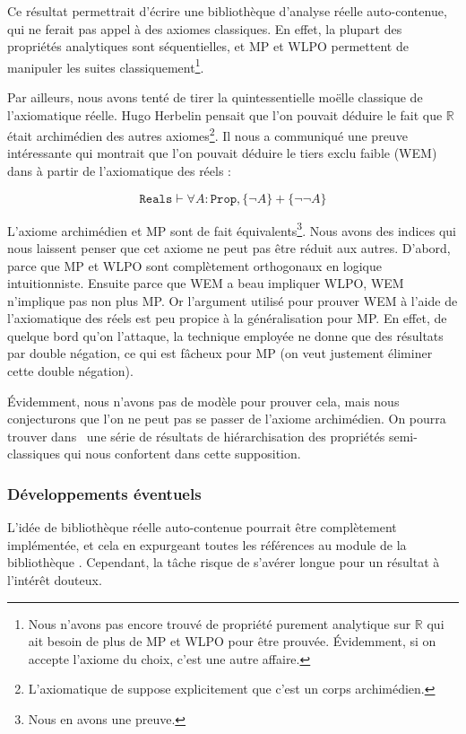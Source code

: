 Ce résultat permettrait d'écrire une bibliothèque d'analyse réelle auto-contenue, qui ne ferait pas appel à des axiomes classiques. En effet, la plupart des propriétés analytiques sont séquentielles, et MP et WLPO permettent de manipuler les suites classiquement\footnote{Nous n'avons pas encore trouvé de propriété purement analytique sur $\mathbb{R}$ qui ait besoin de plus de MP et WLPO pour être prouvée. Évidemment, si on accepte l'axiome du choix, c'est une autre affaire.}.

Par ailleurs, nous avons tenté de tirer la quintessentielle moëlle classique de l'axiomatique réelle. Hugo Herbelin pensait que l'on pouvait déduire le fait que $\mathbb{R}$ était archimédien des autres axiomes\footnote{L'axiomatique de \Coq{} suppose explicitement que c'est un corps archimédien.}. Il nous a communiqué une preuve intéressante qui montrait que l'on pouvait déduire le tiers exclu faible (WEM) dans  à partir de l'axiomatique des réels :

$$\mathtt{Reals}\vdash\forall A : \mathtt{Prop}, \{\neg A\} + \{\neg\neg A\}$$

L'axiome archimédien et MP sont de fait équivalents\footnote{Nous en avons une preuve.}. Nous avons des indices qui nous laissent penser que cet axiome ne peut pas être réduit aux autres. D'abord, parce que MP et WLPO sont complètement orthogonaux en logique intuitionniste. Ensuite parce que WEM a beau impliquer WLPO, WEM n'implique pas non plus MP. Or l'argument utilisé pour prouver WEM à l'aide de l'axiomatique des réels est peu propice à la généralisation pour MP. En effet, de quelque bord qu'on l'attaque, la technique employée ne donne que des résultats par double négation, ce qui est fâcheux pour MP (on veut justement éliminer cette double négation).

Évidemment, nous n'avons pas de modèle pour prouver cela, mais nous conjecturons que l'on ne peut pas se passer de l'axiome archimédien. On pourra trouver dans~\cite{LICS04} une série de résultats de hiérarchisation des propriétés semi-classiques qui nous confortent dans cette supposition.

\subsubsection{Développements éventuels}

L'idée de bibliothèque réelle auto-contenue pourrait être complètement implémentée, et cela en expurgeant toutes les références au module  de la bibliothèque . Cependant, la tâche risque de s'avérer longue pour un résultat à l'intérêt douteux.

